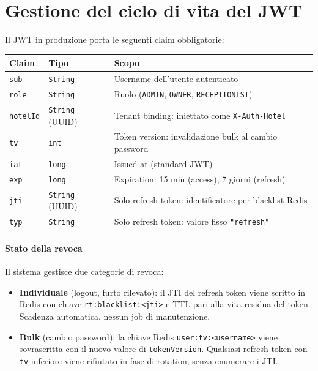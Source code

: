 ﻿\documentclass[a4paper,12pt]{report}
\begin{document}
\section{Gestione del ciclo di vita del JWT}

Il JWT in produzione porta le seguenti claim obbligatorie:

\begin{center}
\small
\begin{tabular}{llp{6.5cm}}
\toprule
\textbf{Claim} & \textbf{Tipo} & \textbf{Scopo} \\
\midrule
\texttt{sub}     & \texttt{String} & Username dell'utente autenticato \\
\texttt{role}    & \texttt{String} & Ruolo (\texttt{ADMIN}, \texttt{OWNER}, \texttt{RECEPTIONIST}) \\
\texttt{hotelId} & \texttt{String} (UUID) & Tenant binding: iniettato come \texttt{X-Auth-Hotel} \\
\texttt{tv}      & \texttt{int}    & Token version: invalidazione bulk al cambio password \\
\texttt{iat}     & \texttt{long}   & Issued at (standard JWT) \\
\texttt{exp}     & \texttt{long}   & Expiration: 15 min (access), 7 giorni (refresh) \\
\texttt{jti}     & \texttt{String} (UUID) & Solo refresh token: identificatore per blacklist Redis \\
\texttt{typ}     & \texttt{String} & Solo refresh token: valore fisso \texttt{"refresh"} \\
\bottomrule
\end{tabular}
\end{center}

\paragraph{Stato della revoca}
Il sistema gestisce due categorie di revoca:

\begin{itemize}
  \item \textbf{Individuale} (logout, furto rilevato): il JTI del refresh token
        viene scritto in Redis con chiave \texttt{rt:blacklist:<jti>} e TTL
        pari alla vita residua del token. Scadenza automatica, nessun job di
        manutenzione.
  \item \textbf{Bulk} (cambio password): la chiave Redis
        \texttt{user:tv:<username>} viene sovrascritta con il nuovo valore
        di \texttt{tokenVersion}. Qualsiasi refresh token con \texttt{tv} inferiore
        viene rifiutato in fase di rotation, senza enumerare i JTI.
\end{itemize}
\end{document}
